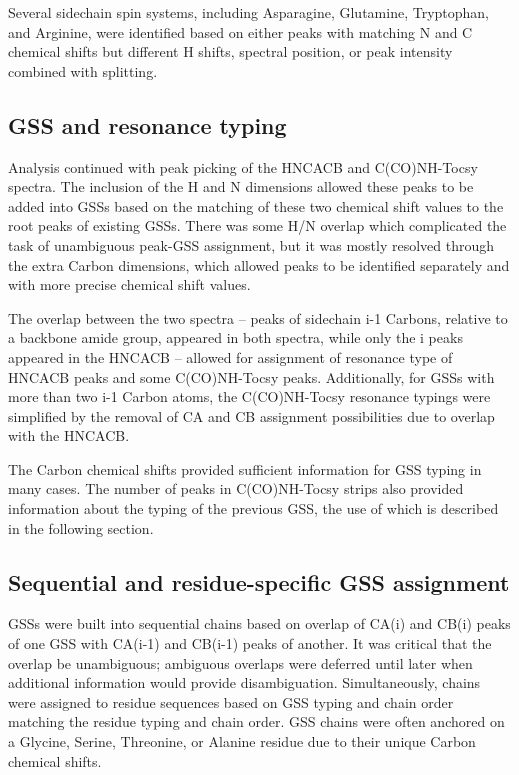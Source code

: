 Several sidechain spin systems, including Asparagine, Glutamine, Tryptophan,
and Arginine, were identified based on either peaks with matching N and C
chemical shifts but different H shifts, spectral position, or peak intensity
combined with splitting.

\subsection{GSS and resonance typing}
Analysis continued with peak picking of the HNCACB and C(CO)NH-Tocsy spectra.
The inclusion of the H and N dimensions allowed these peaks to be added into
GSSs based on the matching of these two chemical shift values to the
root peaks of existing GSSs.  There was some H/N overlap which complicated the
task of unambiguous peak-GSS assignment, but it was mostly resolved through
the extra Carbon dimensions, which allowed peaks to be identified separately
and with more precise chemical shift values.

The overlap between the two spectra -- peaks of sidechain i-1 Carbons, relative
to a backbone amide group, appeared in both spectra, while only the i peaks
appeared in the HNCACB -- allowed for assignment of resonance type of HNCACB
peaks and some C(CO)NH-Tocsy peaks.  Additionally, for GSSs with more than two
i-1 Carbon atoms, the C(CO)NH-Tocsy resonance typings were simplified by the
removal of CA and CB assignment possibilities due to overlap with the HNCACB.

The Carbon chemical shifts provided sufficient information for GSS typing
in many cases.  The number of peaks in C(CO)NH-Tocsy strips also provided 
information about the typing of the previous GSS, the use of which is described
in the following section.

\subsection{Sequential and residue-specific GSS assignment}
GSSs were built into sequential chains based on overlap of CA(i) and CB(i) 
peaks of one GSS with CA(i-1) and CB(i-1) peaks of another.  It was critical
that the overlap be unambiguous; ambiguous overlaps were deferred until later
when additional information would provide disambiguation.
Simultaneously, chains were assigned to residue sequences based on GSS typing
and chain order matching the residue typing and chain order.  GSS chains
were often anchored on a Glycine, Serine, Threonine, or Alanine residue due
to their unique Carbon chemical shifts.

